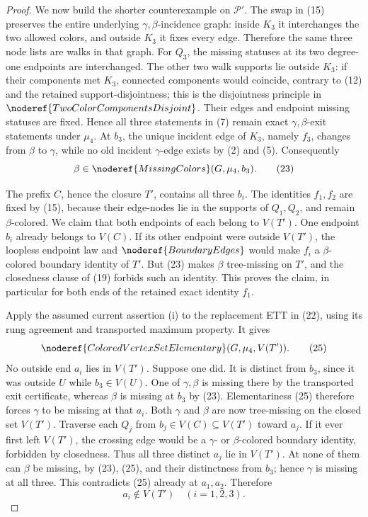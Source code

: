 \begin{proof}
We now build the shorter counterexample on \(\mathcal P'\).  The swap in
(15) preserves the entire underlying \(\gamma,\beta\)-incidence graph:
inside \(K_3\) it interchanges the two allowed colors, and outside
\(K_3\) it fixes every edge.  Therefore the same three node lists are
walks in that graph.  For \(Q_3\), the missing statuses at its two
degree-one endpoints are interchanged.  The other two walk supports lie
outside \(K_3\): if their components met \(K_3\), connected components
would coincide, contrary to (12) and the retained support-disjointness;
this is the disjointness principle in
\(\noderef{TwoColorComponentsDisjoint}\).  Their edges and endpoint
missing statuses are fixed.  Hence all three statements in (7) remain
exact \(\gamma,\beta\)-exit statements under \(\mu_4\).  At \(b_3\),
the unique incident edge of \(K_3\), namely \(f_3\), changes from
\(\beta\) to \(\gamma\), while no old incident \(\gamma\)-edge exists by
(2) and (5).  Consequently
\[
                 \beta\in\noderef{MissingColors}(G,\mu_4,b_3).
                                                                    \tag{23}
\]

The prefix \(C\), hence the closure \(T'\), contains all three \(b_i\).
The identities \(f_1,f_2\) are fixed by (15), because their edge-nodes
lie in the supports of \(Q_1,Q_2\), and remain \(\beta\)-colored.  We
claim that both endpoints of each belong to \(V(T')\).  One endpoint
\(b_i\) already belongs to \(V(C)\).  If its other endpoint were outside
\(V(T')\), the loopless endpoint law and
\(\noderef{BoundaryEdges}\) would make \(f_i\) a \(\beta\)-colored
boundary identity of \(T'\).  But (23) makes \(\beta\) tree-missing on
\(T'\), and the closedness clause of (19) forbids such an identity.
This proves the claim, in particular for both ends of the retained exact
identity \(f_1\).                                               \(\tag{24}\)

Apply the assumed current assertion (i) to the replacement ETT in (22),
using its rung agreement and transported maximum property.  It gives
\[
       \noderef{ColoredVertexSetElementary}(G,\mu_4,V(T')).   \tag{25}
\]
No outside end \(a_i\) lies in \(V(T')\).  Suppose one did.  It is
distinct from \(b_3\), since it was outside \(U\) while \(b_3\in V(U)\).
One of \(\gamma,\beta\) is missing there by the transported exit
certificate, whereas \(\beta\) is missing at \(b_3\) by (23).
Elementariness (25) therefore forces \(\gamma\) to be missing at that
\(a_i\).  Both \(\gamma\) and \(\beta\) are now tree-missing on the
closed set \(V(T')\).  Traverse each \(Q_j\) from
\(b_j\in V(C)\subseteq V(T')\) toward \(a_j\).  If it ever first left
\(V(T')\), the crossing edge would be a \(\gamma\)- or
\(\beta\)-colored boundary identity, forbidden by closedness.  Thus all
three distinct \(a_j\) lie in \(V(T')\).  At none of them can \(\beta\)
be missing, by (23), (25), and their distinctness from \(b_3\); hence
\(\gamma\) is missing at all three.  This contradicts (25) already at
\(a_1,a_2\).  Therefore
\[
                              a_i\notin V(T')\quad(i=1,2,3).   \tag{26}
\]


\end{proof}
